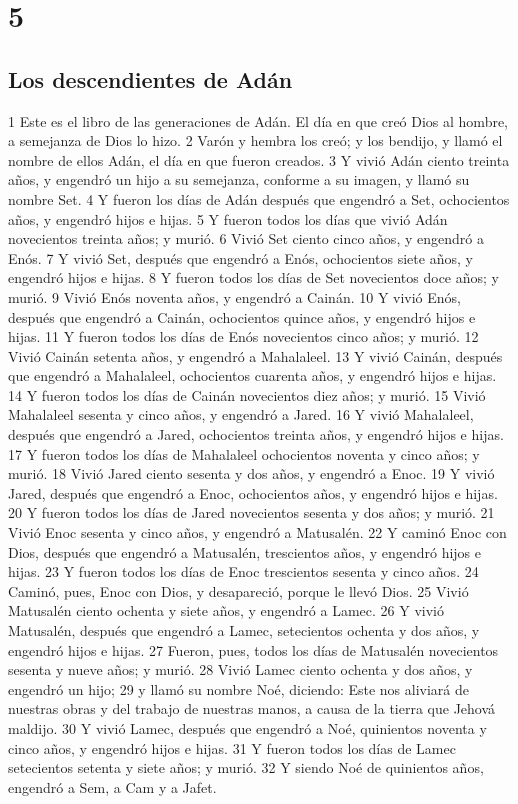 \chapter{5}

\section*{Los descendientes de Adán}

1 Este es el libro de las generaciones de Adán. El día en que creó Dios al hombre, a semejanza de Dios lo hizo.
2 Varón y hembra los creó; y los bendijo, y llamó el nombre de ellos Adán, el día en que fueron creados.
3 Y vivió Adán ciento treinta años, y engendró un hijo a su semejanza, conforme a su imagen, y llamó su nombre Set.
4 Y fueron los días de Adán después que engendró a Set, ochocientos años, y engendró hijos e hijas.
5 Y fueron todos los días que vivió Adán novecientos treinta años; y murió.
6 Vivió Set ciento cinco años, y engendró a Enós.
7 Y vivió Set, después que engendró a Enós, ochocientos siete años, y engendró hijos e hijas.
8 Y fueron todos los días de Set novecientos doce años; y murió.
9 Vivió Enós noventa años, y engendró a Cainán.
10 Y vivió Enós, después que engendró a Cainán, ochocientos quince años, y engendró hijos e hijas.
11 Y fueron todos los días de Enós novecientos cinco años; y murió.
12 Vivió Cainán setenta años, y engendró a Mahalaleel.
13 Y vivió Cainán, después que engendró a Mahalaleel, ochocientos cuarenta años, y engendró hijos e hijas.
14 Y fueron todos los días de Cainán novecientos diez años; y murió.
15 Vivió Mahalaleel sesenta y cinco años, y engendró a Jared.
16 Y vivió Mahalaleel, después que engendró a Jared, ochocientos treinta años, y engendró hijos e hijas.
17 Y fueron todos los días de Mahalaleel ochocientos noventa y cinco años; y murió.
18 Vivió Jared ciento sesenta y dos años, y engendró a Enoc.
19 Y vivió Jared, después que engendró a Enoc, ochocientos años, y engendró hijos e hijas.
20 Y fueron todos los días de Jared novecientos sesenta y dos años; y murió.
21 Vivió Enoc sesenta y cinco años, y engendró a Matusalén.
22 Y caminó Enoc con Dios, después que engendró a Matusalén, trescientos años, y engendró hijos e hijas.
23 Y fueron todos los días de Enoc trescientos sesenta y cinco años.
24 Caminó, pues, Enoc con Dios, y desapareció, porque le llevó Dios.
25 Vivió Matusalén ciento ochenta y siete años, y engendró a Lamec.
26 Y vivió Matusalén, después que engendró a Lamec, setecientos ochenta y dos años, y engendró hijos e hijas.
27 Fueron, pues, todos los días de Matusalén novecientos sesenta y nueve años; y murió.
28 Vivió Lamec ciento ochenta y dos años, y engendró un hijo;
29 y llamó su nombre Noé, diciendo: Este nos aliviará de nuestras obras y del trabajo de nuestras manos, a causa de la tierra que Jehová maldijo.
30 Y vivió Lamec, después que engendró a Noé, quinientos noventa y cinco años, y engendró hijos e hijas.
31 Y fueron todos los días de Lamec setecientos setenta y siete años; y murió.
32 Y siendo Noé de quinientos años, engendró a Sem, a Cam y a Jafet.

